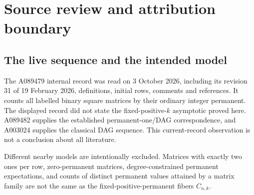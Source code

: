 \documentclass[11pt]{article}
\theoremstyle{definition}\newtheorem{definition}[theorem]{Definition}
\theoremstyle{remark}\newtheorem{remark}[theorem]{Remark}
\begin{document}
\section{Source review and attribution boundary}\label{fpm:sec:prior}
\subsection{The live sequence and the intended model}
The A089479 internal record was read on 3 October 2026, including its revision 31 of 19 February 2026, definitions, initial rows, comments and references. It counts all labelled binary square matrices by their ordinary integer permanent. The displayed record did not state the fixed-positive-$k$ asymptotic proved here. A089482 supplies the established permanent-one/DAG correspondence, and A003024 supplies the classical DAG sequence. This current-record observation is not a conclusion about all literature.

Different nearby models are intentionally excluded. Matrices with exactly two ones per row, zero-permanent matrices, degree-constrained permanent expectations, and counts of distinct permanent values attained by a matrix family are not the same as the fixed-positive-permanent fibers $C_{n,k}$.
\end{document}
